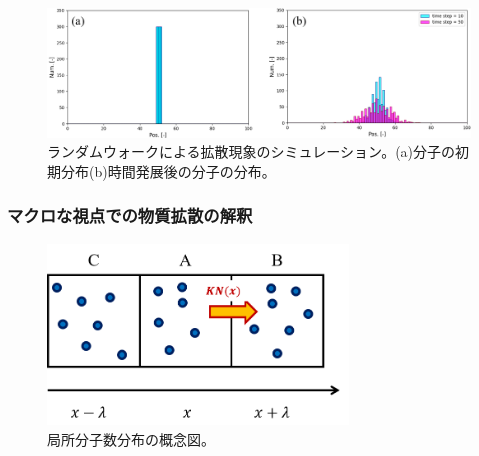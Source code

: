 \documentclass[dvipdfmx, 9pt, a4paper]{jsarticle}
\begin{document}
\begin{figure}[t]
\begin{center}
\includegraphics[width=14cm]{fig2.png}
\caption{ランダムウォークによる拡散現象のシミュレーション。(a)分子の初期分布(b)時間発展後の分子の分布。}
\end{center}
\end{figure}

\subsubsection{マクロな視点での物質拡散の解釈}

\begin{figure}[t]
\begin{center}
\includegraphics[width=8cm]{fig3.png}
\caption{局所分子数分布の概念図。}
\end{center}
\end{figure}
\end{document}
